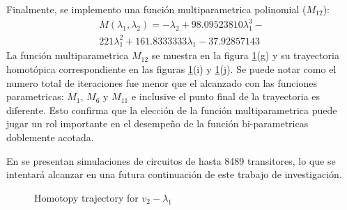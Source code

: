 \documentclass[conference,letterpaper,twocolumn]{IEEEtran}
\begin{document}
Finalmente, se implemento una función  multiparametrica polinomial ($M_{12}$): 
{\small
\begin{displaymath}
\begin{array}{c}
M(\lambda_1,\lambda_2)=-\lambda_2+ 98.09523810\lambda_1^3- \\ 221\lambda_1^2+ 161.8333333\lambda_1-37.92857143
\end{array}
\end{displaymath}
}
La función multiparametrica $M_{12}$ se muestra en la figura \ref{yamaie}(g) y su trayectoria
homotópica correspondiente en las figuras \ref{yamaie}(i) y \ref{yamaie}(j). Se puede notar como
el numero total de iteraciones fue menor que el alcanzado con las funciones parametricas: $M_1$, $M_6$ y $M_{11}$
e inclusive el punto final de la trayectoria es diferente. Esto confirma que la elección de la función
multiparametrica puede jugar un rol importante en el desempeño de la función bi-parametricas doblemente acotada.


En \cite{homo_MOS}
se presentan simulaciones de circuitos de hasta 8489 transitores, lo que se intentará alcanzar en una futura  continuación
de este trabajo de investigación.




\begin{figure}[hbtp]
\centerline{
\epsfxsize=105mm
}
\caption{Homotopy trajectory for $v_2-\lambda_1$}
\label{yamaie}
\end{figure}



\begin{table}[htbp]
{\small
{}
}
\caption{Puntos extremos de las 3 trayectorias homotópicas, considerando $\lambda_1=0.5$ and $\lambda_2=0$.}
\label{yamamuracircuitosoluc}
\end{table}
\end{document}

